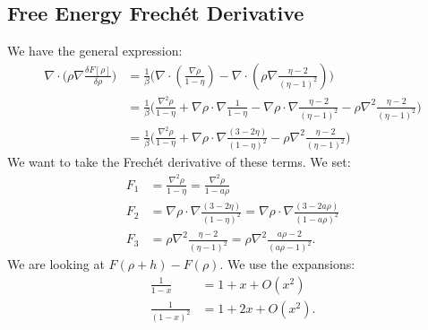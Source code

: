 \documentclass[11pt, a4paper]{article}
\theoremstyle{definition}
\begin{document}
\subsection{Free Energy Frech\'et Derivative}
We have the general expression: 
\begin{align*}
\nabla \cdot \bigg(\rho \nabla \frac{\delta F[\rho]}{\delta \rho}\bigg) &= \frac{1}{\beta} \bigg( \nabla  \cdot \left(  \frac{\nabla \rho}{1 - \eta} \right) - \nabla  \cdot \left(\rho \nabla\frac{\eta - 2}{(\eta - 1)^2} \right) \bigg)\\
&= \frac{1}{\beta} \bigg( \frac{\nabla^2 \rho}{1 - \eta} +  \nabla \rho \cdot \nabla \frac{1}{1 - \eta} - \nabla \rho \cdot \nabla \frac{\eta - 2}{(\eta - 1)^2} - \rho \nabla^2\frac{\eta - 2}{(\eta - 1)^2} \bigg)\\
&= \frac{1}{\beta} \bigg( \frac{\nabla^2 \rho}{1 - \eta} +  \nabla \rho \cdot \nabla \frac{(3- 2 \eta)}{(1 - \eta)^2}  - \rho \nabla^2\frac{\eta - 2}{(\eta - 1)^2} \bigg)
\end{align*}
We want to take the Frech\'et derivative of these terms.
We set:
\begin{align*}
F_1 &= \frac{\nabla^2 \rho}{1 - \eta}= \frac{\nabla^2 \rho}{1 - a \rho}\\
F_2 &= \nabla \rho \cdot \nabla \frac{(3- 2 \eta)}{(1 - \eta)^2} = \nabla \rho \cdot \nabla \frac{(3- 2 a \rho)}{(1 - a \rho)^2} \\
F_3 &= \rho \nabla^2\frac{\eta - 2}{(\eta - 1)^2}= \rho \nabla^2\frac{a \rho - 2}{(a \rho - 1)^2}.
\end{align*}
We are looking at $F(\rho + h) - F(\rho)$. We use the expansions:
\begin{align*}
	\frac{1}{1-x} &= 1 + x + O(x^2)\\
	\frac{1}{(1-x)^2} & = 1 + 2x + O(x^2).
\end{align*}
\end{document}
